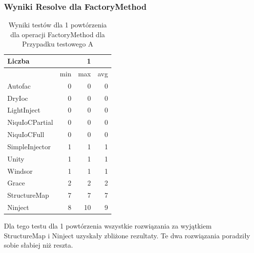\documentclass[12pt]{article}
\begin{document}
\subsubsection{Wyniki Resolve dla FactoryMethod}
\begin{table}[H]
\captionsetup{belowskip=0pt,aboveskip=0pt}
\begin{center}
\begin{small}
	\begin{tabular}{ | l | r r r | }
    		\hline
Liczba & & 1 & \\ \hline
 & min & max & avg \\ \hline
Autofac & 0 & 0 & 0 \\ \hline
DryIoc & 0 & 0 & 0 \\ \hline
LightInject & 0 & 0 & 0 \\ \hline
NiquIoCPartial & 0 & 0 & 0 \\ \hline
NiquIoCFull & 0 & 0 & 0 \\ \hline
SimpleInjector & 1 & 1 & 1 \\ \hline
Unity & 1 & 1 & 1 \\ \hline
Windsor & 1 & 1 & 1 \\ \hline
Grace & 2 & 2 & 2 \\ \hline
StructureMap & 7 & 7 & 7 \\ \hline
Ninject & 8 & 10 & 9 \\ \hline
  	\end{tabular}
\end{small}
\end{center}
\caption{Wyniki testów dla 1 powtórzenia dla operacji FactoryMethod dla Przypadku testowego A}
\label{TestCaseA_FactoryMethod1}
\end{table}
Dla tego testu dla 1 powtórzenia wszystkie rozwiązania za wyjątkiem StructureMap i Ninject uzyskały zbliżone rezultaty. Te dwa rozwiązania poradziły sobie słabiej niż reszta.
\end{document}

